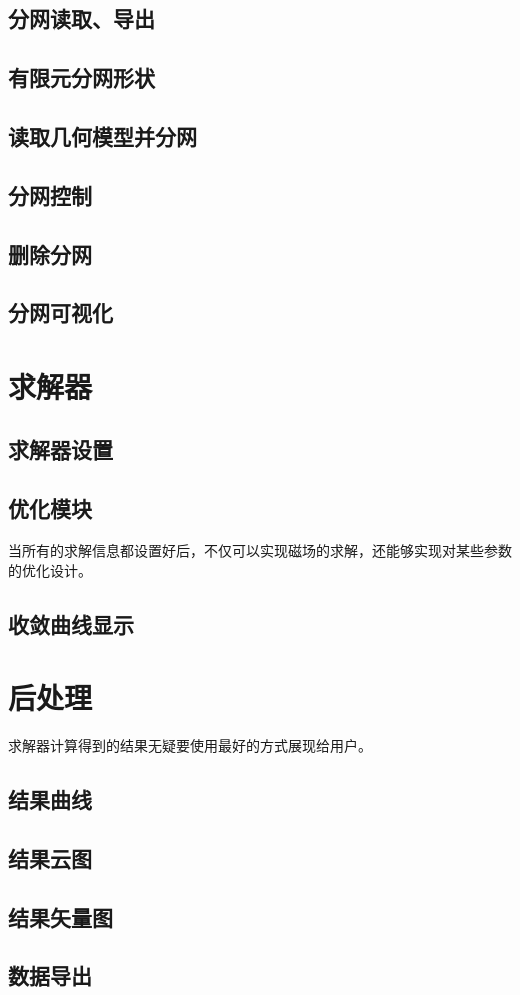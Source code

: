 \subsection{分网读取、导出}

\subsection{有限元分网形状}

\subsection{读取几何模型并分网}

\subsection{分网控制}

\subsection{删除分网}

\subsection{分网可视化}

\section{求解器}

\subsection{求解器设置}

\subsection{优化模块}
当所有的求解信息都设置好后，不仅可以实现磁场的求解，还能够实现对某些参数的优化设计。

\subsection{收敛曲线显示}

\section{后处理}
求解器计算得到的结果无疑要使用最好的方式展现给用户。
\subsection{结果曲线}

\subsection{结果云图}

\subsection{结果矢量图}

\subsection{数据导出}